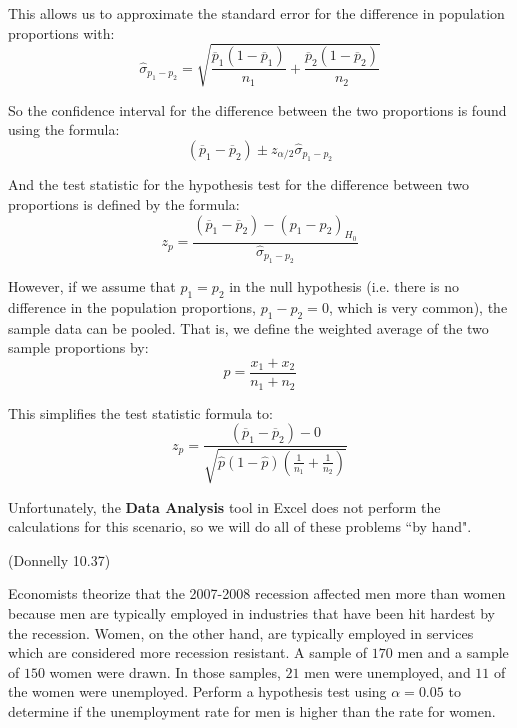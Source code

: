 \documentclass[12pt, letterpaper]{article}
\newcounter{exercise}
\theoremstyle{definition}
\begin{document}
\vspace*{.1in}

\noindent This allows us to approximate the standard error for the difference in population proportions with:
$$ \hat{\sigma}_{p_1-p_2} = \sqrt{\frac{\overline{p}_1(1-\overline{p}_1)}{n_1}+\frac{\overline{p}_2(1-\overline{p}_2)}{n_2}} $$

\noindent So the confidence interval for the difference between the two proportions is found using the formula:
$$ (\overline{p}_1-\overline{p}_2)\pm z_{\alpha/2}\hat{\sigma}_{p_1-p_2} $$

\noindent And the test statistic for the hypothesis test for the difference between two proportions is defined by the formula:
$$ z_p = \frac{(\overline{p}_1-\overline{p}_2)-(p_1-p_2)_{H_0}}{\hat{\sigma}_{p_1-p_2}} $$

\noindent However, if we assume that $p_1=p_2$ in the null hypothesis (i.e. there is no difference in the population proportions, $p_1-p_2 =0$, which is very common), the sample data can be pooled.  That is, we define the weighted average of the two sample proportions by:
$$ \hat{p} = \frac{x_1+x_2}{n_1+n_2} $$

\noindent This simplifies the test statistic formula to:
$$ z_p = \frac{(\overline{p}_1-\overline{p}_2) -0}{\sqrt{\hat{p}(1-\hat{p})\left( \frac{1}{n_1}+\frac{1}{n_2} \right)}} $$

\noindent Unfortunately, the \textbf{Data Analysis} tool in Excel does not perform the calculations for this scenario, so we will do all of these problems ``by hand".

\newpage


\begin{exercise}  (Donnelly 10.37)

Economists theorize that the 2007-2008 recession affected men more than women because men are typically employed in industries that have been hit hardest by the recession.  Women, on the other hand, are typically employed in services which are considered more recession resistant.  A sample of $170$ men and a sample of $150$ women were drawn.  In those samples, $21$ men were unemployed, and $11$ of the women were unemployed.  Perform a hypothesis test using $\alpha = 0.05$ to determine if the unemployment rate for men is higher than the rate for women.

\end{exercise}


\vfill

\newpage
\end{document}

